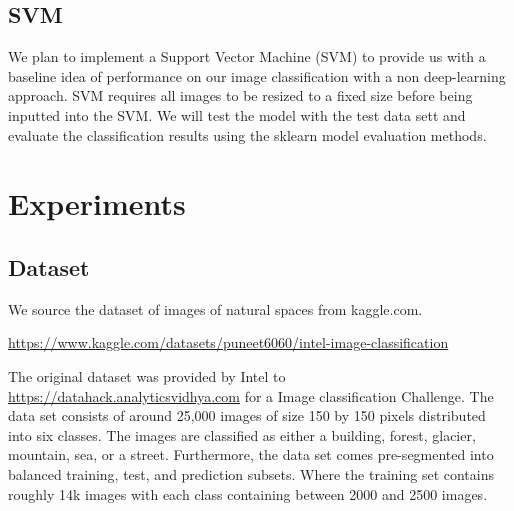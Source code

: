 \documentclass{article}
\begin{document}
\subsection{SVM}

\par We plan to implement a Support Vector Machine (SVM) to provide us with a baseline idea of performance on our image classification with a non deep-learning approach. SVM requires all images to be resized to a fixed size before being inputted into the SVM. We will test the model with the test data sett and evaluate the classification results using the sklearn model evaluation methods.

\section{Experiments}

\subsection{Dataset}

We source the dataset of images of natural spaces from kaggle.com.
\begin{center}
    \url{https://www.kaggle.com/datasets/puneet6060/intel-image-classification}
\end{center}

The original dataset was provided by Intel to \url{https://datahack.analyticsvidhya.com} for a Image classification Challenge. 
The data set consists of around 25,000 images of size 150 by 150 pixels distributed into six classes.
The images are classified as either a building, forest, glacier, mountain, sea, or a street.
Furthermore, the data set comes pre-segmented into balanced training, test, and prediction subsets. 
Where the training set contains roughly 14k images with each class containing between 2000 and 2500 images.
\end{document}
